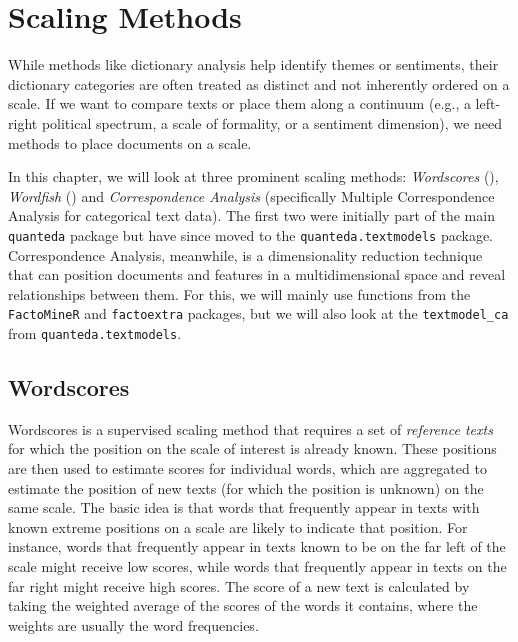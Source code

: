 \documentclass[
]{book}
\begin{document}
\chapter{Scaling Methods}\label{scaling}

While methods like dictionary analysis help identify themes or sentiments, their dictionary categories are often treated as distinct and not inherently ordered on a scale. If we want to compare texts or place them along a continuum (e.g., a left-right political spectrum, a scale of formality, or a sentiment dimension), we need methods to place documents on a scale.

In this chapter, we will look at three prominent scaling methods: \emph{Wordscores} (), \emph{Wordfish} () and \emph{Correspondence Analysis} (specifically Multiple Correspondence Analysis for categorical text data). The first two were initially part of the main \texttt{quanteda} package but have since moved to the \texttt{quanteda.textmodels} package. Correspondence Analysis, meanwhile, is a dimensionality reduction technique that can position documents and features in a multidimensional space and reveal relationships between them. For this, we will mainly use functions from the \texttt{FactoMineR} and \texttt{factoextra} packages, but we will also look at the \texttt{textmodel\_ca} from \texttt{quanteda.textmodels}.

\section{Wordscores}\label{wordscores}

Wordscores is a supervised scaling method that requires a set of \emph{reference texts} for which the position on the scale of interest is already known. These positions are then used to estimate scores for individual words, which are aggregated to estimate the position of new texts (for which the position is unknown) on the same scale. The basic idea is that words that frequently appear in texts with known extreme positions on a scale are likely to indicate that position. For instance, words that frequently appear in texts known to be on the far left of the scale might receive low scores, while words that frequently appear in texts on the far right might receive high scores. The score of a new text is calculated by taking the weighted average of the scores of the words it contains, where the weights are usually the word frequencies.
\end{document}
